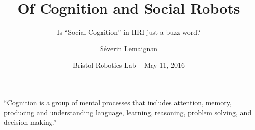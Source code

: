 \documentclass[compress]{beamer}
\title{Of Cognition and Social Robots}
\subtitle{Is ``Social Cognition'' in HRI just a buzz word?}
\date{Bristol Robotics Lab -- {\Medium May 11, 2016}}
\author{Séverin Lemaignan}
\institute{Centre for Robotics and Neural Systems\\{\Medium
Plymouth University}}
\begin{document}
\maketitle





\begin{frame}[plain]{}

        \LARGE

        ``Cognition is a group of mental processes that includes {\Medium
        attention}, {\Medium memory}, producing and understanding {\Medium
        language}, {\Medium learning}, {\Medium reasoning}, {\Medium problem
        solving}, and {\Medium decision making}.''

\end{frame}
\end{document}
